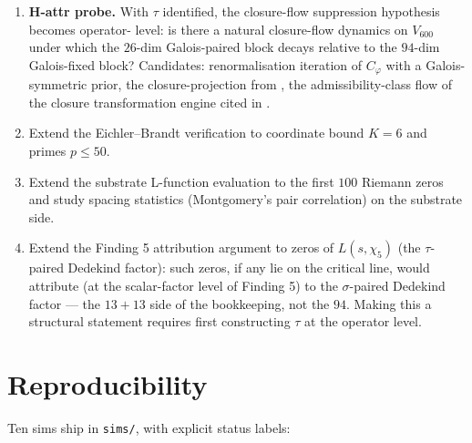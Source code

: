 \documentclass[11pt,a4paper]{article}
\newcommand{\Vsix}{V_{600}}
\newcommand{\Cphi}{C_\varphi}
\begin{document}
\begin{enumerate}[leftmargin=*]
  \item \textbf{H-attr probe.} With $\tau$ identified, the
        closure-flow suppression hypothesis becomes operator-
        level: is there a natural closure-flow dynamics on $\Vsix$
        under which the $26$-dim Galois-paired block decays
        relative to the $94$-dim Galois-fixed block? Candidates:
        renormalisation iteration of $\Cphi$ with a Galois-
        symmetric prior, the closure-projection from
        \cite{closurePicture}, the admissibility-class flow of the
        closure transformation engine cited in
        \cite{translationLayer}.
  \item Extend the Eichler--Brandt verification to coordinate
        bound $K = 6$ and primes $p \le 50$.
  \item Extend the substrate L-function evaluation to the first
        $100$ Riemann zeros and study spacing statistics
        (Montgomery's pair correlation) on the substrate side.
  \item Extend the Finding 5 attribution argument to zeros of
        $L(s, \chi_5)$ (the $\tau$-paired Dedekind factor): such
        zeros, if any lie on the critical line, would attribute
        (at the scalar-factor level of Finding 5) to the
        $\sigma$-paired Dedekind factor --- the $13 + 13$ side of
        the bookkeeping, not the $94$. Making this a structural
        statement requires first constructing $\tau$ at the
        operator level.
\end{enumerate}

\section{Reproducibility}
\label{sec:repro}

Ten sims ship in \texttt{sims/}, with explicit status labels:
\end{document}
